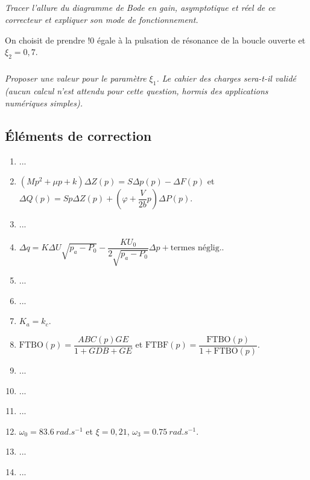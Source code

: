 \documentclass[10pt,fleqn]{article} %
\begin{document}
\begin{multicols}{2}
\subparagraph{}\textit{Tracer l’allure du diagramme de Bode en gain, asymptotique et réel de ce correcteur et
expliquer son mode de fonctionnement.}

On choisit de prendre !0 égale à la pulsation de résonance de la boucle ouverte et $\xi_2 = 0,7$.


\subparagraph{}\textit{Proposer une valeur pour le paramètre $\xi_1$. Le cahier des charges sera-t-il validé (aucun
calcul n’est attendu pour cette question, hormis des applications numériques simples).}



\subsection*{Éléments de correction}
\begin{enumerate}
\item ...
\item $\left(Mp^2+\mu p + k \right)\Delta Z(p) = S\Delta p (p)-\Delta F(p)$ et $\Delta Q(p)=S p \Delta Z(p) + \left( \varphi + \dfrac{V}{2b} p \right) \Delta P(p)$.
\item ...
\item $\Delta q = K\Delta U\sqrt{p_a - P_0} - \dfrac{KU_0}{2\sqrt{p_a - P_0}}\Delta p + \text{termes néglig.}$.
\item ...
\item ...
\item $K_a = k_c$.
\item $\text{FTBO}(p)=\dfrac{ABC(p)GE}{1+GDB+GE}$ et $\text{FTBF}(p)=\dfrac{\text{FTBO}(p)}{1+\text{FTBO}(p)}$.
\item ...
\item ...
\item ...
\item $\omega_0=\SI{83,6}{rad.s^{-1}}$ et $\xi=0,21$, $\omega_3 = \SI{0,75}{rad.s^{-1}}$.
\item ...
\item ...
\end{enumerate}
\end{multicols}
\end{document}
